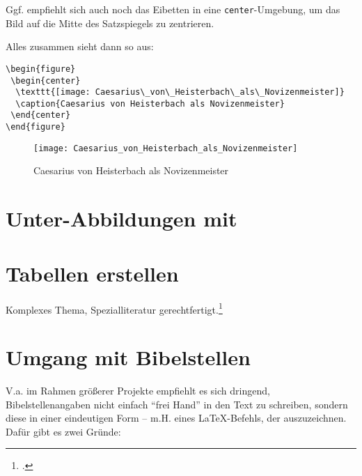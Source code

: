Ggf. empfiehlt sich auch noch das Eibetten in eine \lstinline/center/-Umgebung,
um das Bild auf die Mitte des Satzspiegels zu zentrieren.

Alles zusammen sieht dann so aus:

\begin{lstlisting}
\begin{figure}
 \begin{center}
  \texttt{[image: Caesarius\_von\_Heisterbach\_als\_Novizenmeister]}
  \caption{Caesarius von Heisterbach als Novizenmeister}
 \end{center}
\end{figure} 
\end{lstlisting}


\begin{figure}[!htb]
\centering
  \texttt{[image: Caesarius\_von\_Heisterbach\_als\_Novizenmeister]}
  \caption{Caesarius von Heisterbach als Novizenmeister}
\end{figure}

\section{Unter-Abbildungen mit \protect{}}


\section{Tabellen erstellen}

Komplexes Thema, Spezialliteratur gerechtfertigt.\footcite{voss:tabellen}







\section{Umgang mit Bibelstellen}

V.a. im Rahmen größerer Projekte empfiehlt es sich dringend, Bibelstellenangaben nicht einfach
\enquote{frei Hand} in den Text zu schreiben, sondern diese in einer eindeutigen Form 
-- m.H. eines \LaTeX{}-Befehls, der auszuzeichnen. 
Dafür gibt es zwei Gründe:

